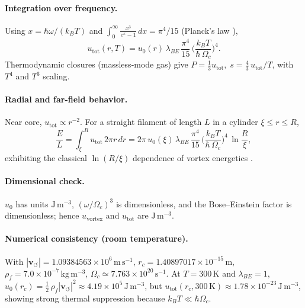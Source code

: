 \documentclass[10pt,reprint,aps,onecolumn,nofootinbib]{revtex4-2}
\begin{document}
    \paragraph{Integration over frequency.}
        Using \(x=\hbar\omega/(k_B T)\) and
        \(\int_0^\infty \tfrac{x^3}{e^x-1}\,dx=\pi^4/15\) (Planck’s law \cite{Planck1901}),
        \begin{equation}
        u_{\mathrm{tot}}(r,T)
        =u_0(r)\,\lambda_{\!BE}\,\frac{\pi^4}{15}\,
        \Big(\frac{k_B T}{\hbar\,\Omega_c}\Big)^{4}.
        \end{equation}
        Thermodynamic closures (massless‐mode gas) give
        \(
        P=\tfrac13 u_{\mathrm{tot}},\;
        s=\tfrac{4}{3}\,u_{\mathrm{tot}}/T
        \),
        with \(T^4\) and \(T^3\) scaling.

    \paragraph{Radial and far-field behavior.}
        Near core, \(u_{\mathrm{tot}}\propto r^{-2}\).
        For a straight filament of length \(L\) in a cylinder \(\xi\le r\le R\),
        \[
            \frac{E}{L}=\int_\xi^{R}u_{\mathrm{tot}}\,2\pi r\,dr
            =2\pi\,u_0(\xi)\,\lambda_{\!BE}\,\frac{\pi^4}{15}\,
            \Big(\frac{k_B T}{\hbar\,\Omega_c}\Big)^{4}\,\ln\!\frac{R}{\xi},
        \]
        exhibiting the classical \(\ln(R/\xi)\) dependence of vortex energetics
        \cite{Saffman1992,Batchelor1967,LandauFM}.

    \paragraph{Dimensional check.}
        \(u_0\) has units \(\mathrm{J\,m^{-3}}\),
        \((\omega/\Omega_c)^3\) is dimensionless, and the Bose–Einstein factor is dimensionless; hence \(u_{\mathrm{vortex}}\) and \(u_{\mathrm{tot}}\) are \(\mathrm{J\,m^{-3}}\).

    \paragraph{Numerical consistency (room temperature).}
        With \(|\mathbf{v}_{\!\boldsymbol{\circlearrowleft}}|=1.09384563\times10^{6}\,\mathrm{m\,s^{-1}}\),
        \(r_c=1.40897017\times10^{-15}\,\mathrm{m}\),
        \(\rho_{\!f}=7.0\times10^{-7}\,\mathrm{kg\,m^{-3}}\),
        \(\Omega_c\simeq 7.763\times10^{20}\,\mathrm{s^{-1}}\).
        At \(T=300\,\mathrm{K}\) and \(\lambda_{\!BE}=1\),
        \(u_0(r_c)=\tfrac12\,\rho_{\!f}|\mathbf{v}_{\!\boldsymbol{\circlearrowleft}}|^{2}\approx 4.19\times10^{5}\,\mathrm{J\,m^{-3}}\),
        but \(u_{\mathrm{tot}}(r_c,300\,\mathrm{K})\approx 1.78\times10^{-23}\,\mathrm{J\,m^{-3}}\),
        showing strong thermal suppression because \(k_B T\ll \hbar\Omega_c\).
\end{document}
